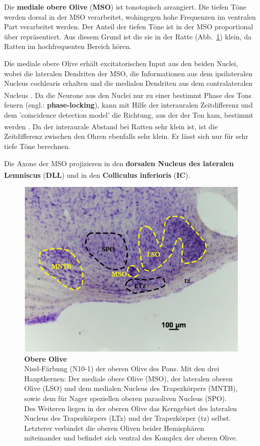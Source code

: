 \documentclass[12pt,a4paper,pdftex]{article}
\begin{document}
\noindent Die \textbf{mediale obere Olive} (\textbf{MSO}) ist tonotopisch arrangiert. Die tiefen Töne werden dorsal in der MSO verarbeitet, wohingegen hohe Frequenzen im ventralen Part verarbeitet werden. Der Anteil der tiefen Töne ist in der MSO proportional über repräsentiert. Aus diesem Grund ist die sie in der Ratte (Abb.~\ref{fig:obere_Olive}) klein, da Ratten im hochfrequenten Bereich hören.

Die mediale obere Olive erhält excitatorischen Input aus den beiden Nuclei, wobei die lateralen Dendriten der MSO, die Informationen aus dem ipsilateralen Nucleus cochlearis erhalten und die medialen Dendriten aus dem contralateralen Nucleus \textsuperscript{\cite[29]{paxinos2014rat}}. Da die Neurone aus den Nuclei nur zu einer bestimmt Phase des Tons feuern (engl.: \textbf{phase-locking}), kann mit Hilfe der interauralen Zeitdifferenz und dem 'coincidence detection model' die Richtung, aus der der Ton kam, bestimmt werden \textsuperscript{\cite[31]{kandel2013principles}}. Da der interaurale Abstand bei Ratten sehr klein ist, ist die Zeitdifferenz zwischen den Ohren ebenfalls sehr klein. Er lässt sich nur für sehr tiefe Töne berechnen.

Die Axone der MSO projizieren in den \textbf{dorsalen Nucleus des lateralen Lemniscus} (\textbf{DLL}) und in den \textbf{Colliculus inferioris} (\textbf{IC})\textsuperscript{\cite[29]{paxinos2014rat}}.
\\

\begin{figure}[H]
    \centering
    \includegraphics{pictures/auditory/obere_olive.png}
    \caption[Obere Olive]{\textbf{Obere Olive}\\
    Nissl-Färbung (N10-1) der oberen Olive des Pons. Mit den drei Hauptkernen: Der mediale obere Olive (MSO), der lateralen oberen Olive (LSO) und dem medialen Nucleus des Trapezkörpers (MNTB), sowie dem für Nager speziellen oberen paraoliven Nucleus (SPO). Des Weiteren liegen in der oberen Olive das Kerngebiet des lateralen Nucleus des Trapezkörpers (LTz) und der Trapezkörper (tz) selbst. Letzterer verbindet die oberen Oliven beider Hemisphären miteinander und befindet sich ventral des Komplex der oberen Olive.}
    \label{fig:obere_Olive}
\end{figure}
\end{document}

